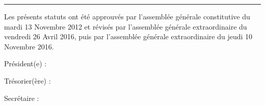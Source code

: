 \documentclass[a4paper, 11pt]{article}
\newcommand{\dateAGC}{mardi 13 Novembre 2012}
\newcommand{\dateAGE}{vendredi 26 Avril 2016}
\newcommand{\dateAGEdeux}{jeudi 10 Novembre 2016}
\newcommand\sep{\noindent\rule{\linewidth}{.5pt}}
\begin{document}


\bigskip\bigskip

\sep

\bigskip\bigskip

Les présents statuts ont été approuvés par l'assemblée générale constitutive du \dateAGC{} et révisés par l'assemblée
générale extraordinaire du \dateAGE{}, puis par l'assemblée générale extraordinaire du \dateAGEdeux{}.

\bigskip\bigskip

Président(e) :

\bigskip\bigskip

Trésorier(ère) :

\bigskip\bigskip

Secrétaire :
\end{document}
